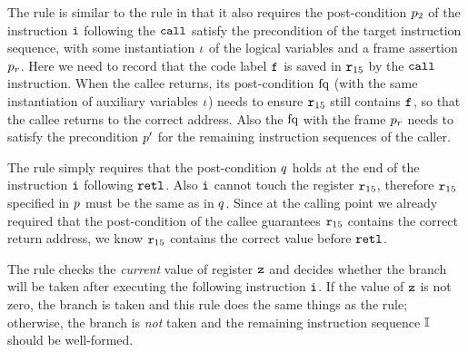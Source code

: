 The  rule is similar to the
  rule in that it also requires the
 post-condition $p_2$ of the instruction
 $\texttt{i}$ following the $\texttt{call}$ satisfy the precondition of the target instruction
sequence, with some instantiation $\iota$ of the
logical variables and a frame assertion $p_r$.
Here we need to record that the code label $\texttt{f}_{}$
is saved in $\texttt{r}_{15}$ by the $\texttt{call}$ instruction.
When the callee returns, its post-condition $\text{fq}$
(with
the same instantiation of auxiliary variables $\iota$)
needs to ensure $\texttt{r}_{15}$ still contains $\texttt{f}_{}$,
so that the callee returns to the correct address.
Also the $\text{fq}$ with the frame $p_r$ needs
to satisfy the precondition $p'$ for the
remaining instruction sequences of the caller.

The  rule simply requires that
the post-condition $q$ holds
at the end of the instruction
$\texttt{i}$ following $\texttt{retl}$.
Also $\texttt{i}$ cannot touch the register $\texttt{r}_{15}$,
therefore $\texttt{r}_{15}$ specified in $p$ must be the same
as in $q$.
Since at the calling point we already required that
the post-condition of the callee guarantees $\texttt{r}_{15}$
contains the correct return address,
we know $\texttt{r}_{15}$ contains the correct value
before $\texttt{retl}$.

The  rule checks the {\em current} value of register $\texttt{z}$
and decides whether the branch will be taken
after executing the following instruction $\texttt{i}{}$. If the
value of $\texttt{z}$ is not zero,
the branch is taken and this rule does the same
things as the  rule; otherwise,
the branch is {\em not} taken and the remaining instruction
sequence $\mathbb{I}$ should be well-formed.

